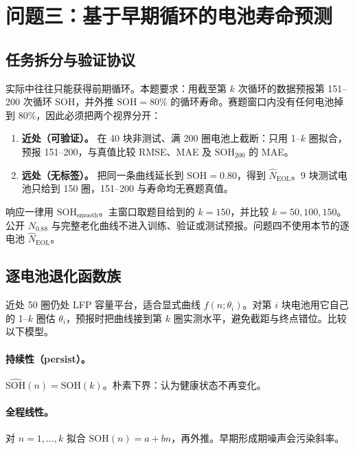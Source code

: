 \section{问题三：基于早期循环的电池寿命预测}

\subsection{任务拆分与验证协议}

实际中往往只能获得前期循环。本题要求：用截至第 \(k\) 次循环的数据预报第 151--200 次循环 SOH，并外推 \(\mathrm{SOH}=80\%\) 的循环寿命\cite{severson2019datadriven,attia2021statistical,zhang2018lstm}。赛题窗口内没有任何电池掉到 80\%，因此必须把两个视界分开：

\begin{enumerate}
  \item \textbf{近处（可验证）。} 在 40 块非测试、满 200 圈电池上截断：只用 1--\(k\) 圈拟合，预报 151--200，与真值比较 RMSE、MAE 及 \(\mathrm{SOH}_{200}\) 的 MAE。
  \item \textbf{远处（无标签）。} 把同一条曲线延长到 \(\mathrm{SOH}=0.80\)，得到 \(\hat N_{\mathrm{EOL}}\)。9 块测试电池只给到 150 圈，151--200 与寿命均无赛题真值。
\end{enumerate}

响应一律用 \(\mathrm{SOH}_{\mathrm{smooth}}\)。主窗口取题目给到的 \(k=150\)，并比较 \(k=50,100,150\)。公开 \(N_{0.88}\) 与完整老化曲线不进入训练、验证或测试预报。问题四不使用本节的逐电池 \(\hat N_{\mathrm{EOL}}\)。

\subsection{逐电池退化函数族}

近处 50 圈仍处 LFP 容量平台，适合显式曲线 \(f(n;\theta_i)\)。对第 \(i\) 块电池用它自己的 1--\(k\) 圈估 \(\theta_i\)，预报时把曲线接到第 \(k\) 圈实测水平，避免截距与终点错位。比较以下模型。

\paragraph{持续性（persist）。}
\(\widehat{\mathrm{SOH}}(n)=\mathrm{SOH}(k)\)。朴素下界：认为健康状态不再变化。

\paragraph{全程线性。}
对 \(n=1,\ldots,k\) 拟合 \(\mathrm{SOH}(n)=a+bn\)，再外推。早期形成期噪声会污染斜率。

